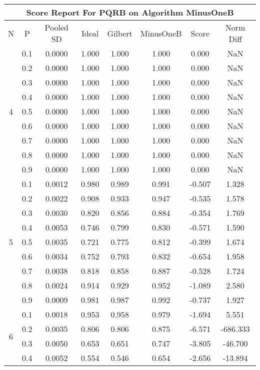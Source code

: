 \documentclass[11pt,a4paper]{report}
\begin{document}
\begin{longtable}{ | c | c || c | c | c | c | c | c | }
\hline
\multicolumn{8}{|c|}{ Score Report For PQRB on Algorithm MinusOneB} \\
\hline
N & P & Pooled SD &  Ideal &  Gilbert & MinusOneB  & Score & Norm Diff \\
 \hline
 \hline
 \endhead
\multirow{9}{*}{4} & 0.1 & 0.0000 & 1.000 & 1.000 & 1.000 & 0.000 & NaN \\
 & 0.2 & 0.0000 & 1.000 & 1.000 & 1.000 & 0.000 & NaN \\
 & 0.3 & 0.0000 & 1.000 & 1.000 & 1.000 & 0.000 & NaN \\
 & 0.4 & 0.0000 & 1.000 & 1.000 & 1.000 & 0.000 & NaN \\
 & 0.5 & 0.0000 & 1.000 & 1.000 & 1.000 & 0.000 & NaN \\
 & 0.6 & 0.0000 & 1.000 & 1.000 & 1.000 & 0.000 & NaN \\
 & 0.7 & 0.0000 & 1.000 & 1.000 & 1.000 & 0.000 & NaN \\
 & 0.8 & 0.0000 & 1.000 & 1.000 & 1.000 & 0.000 & NaN \\
 & 0.9 & 0.0000 & 1.000 & 1.000 & 1.000 & 0.000 & NaN \\
 \hline
\multirow{9}{*}{5} & 0.1 & 0.0012 & 0.980 & 0.989 & 0.991 & -0.507 & 1.328 \\
 & 0.2 & 0.0022 & 0.908 & 0.933 & 0.947 & -0.535 & 1.578 \\
 & 0.3 & 0.0030 & 0.820 & 0.856 & 0.884 & -0.354 & 1.769 \\
 & 0.4 & 0.0053 & 0.746 & 0.799 & 0.830 & -0.571 & 1.590 \\
 & 0.5 & 0.0035 & 0.721 & 0.775 & 0.812 & -0.399 & 1.674 \\
 & 0.6 & 0.0034 & 0.752 & 0.793 & 0.832 & -0.654 & 1.958 \\
 & 0.7 & 0.0038 & 0.818 & 0.858 & 0.887 & -0.528 & 1.724 \\
 & 0.8 & 0.0024 & 0.914 & 0.929 & 0.952 & -1.089 & 2.580 \\
 & 0.9 & 0.0009 & 0.981 & 0.987 & 0.992 & -0.737 & 1.927 \\
 \hline
\multirow{9}{*}{6} & 0.1 & 0.0018 & 0.953 & 0.958 & 0.979 & -1.694 & 5.551 \\
 & 0.2 & 0.0035 & 0.806 & 0.806 & 0.875 & -6.571 & -686.333 \\
 & 0.3 & 0.0050 & 0.653 & 0.651 & 0.747 & -3.805 & -46.700 \\
 & 0.4 & 0.0052 & 0.554 & 0.546 & 0.654 & -2.656 & -13.894 \\

\end{longtable}
\end{document}

